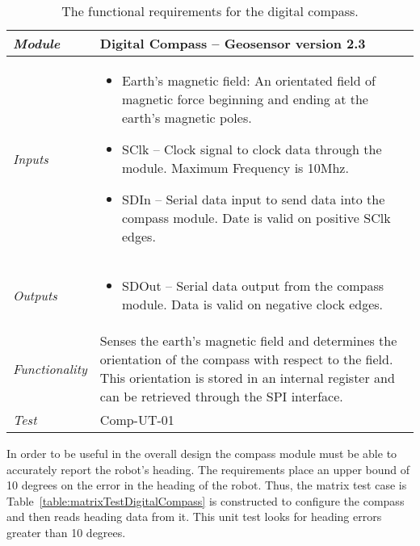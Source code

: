 \begin{table}[h]
\caption{The functional requirements for the digital compass.}
\label{table:functionalDigitalCompass}
\begin{tabular}{|l|m{10cm}|}
\hline
\emph{Module} & Digital Compass -- Geosensor version 2.3 \\ \hline
\emph{Inputs} & 
\begin{itemize}
\item
  Earth's magnetic field: An orientated field of magnetic force
  beginning and ending at the earth's magnetic poles.
\item
  SClk -- Clock signal to clock data through the module. Maximum
  Frequency is 10Mhz.
\item
  SDIn -- Serial data input to send data into the compass module. Date
  is valid on positive SClk edges.
\end{itemize}\\ \hline
\emph{Outputs} & 
\begin{itemize}
\item
  SDOut -- Serial data output from the compass module. Data is valid on
  negative clock edges.
\end{itemize}\\ \hline
\emph{Functionality} & Senses the earth's magnetic field and determines
the orientation of the compass with respect to the field. This
orientation is stored in an internal register and can be retrieved
through the SPI interface. \\ \hline
\emph{Test} & Comp-UT-01 \\  \hline
\end{tabular}
\end{table}

In order to be useful in the overall design the compass module must be
able to accurately report the robot's heading. The requirements place an
upper bound of 10 degrees on the error in the heading of the robot.
Thus, the matrix test case is Table~\ref{table:matrixTestDigitalCompass}
is constructed to configure the
compass and then reads heading data from it. This unit test looks for
heading errors greater than 10 degrees.

